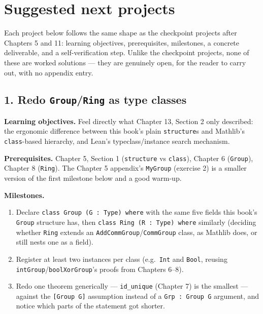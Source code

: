 \section{Suggested next projects}\label{sec:13-next-steps:03-next-projects:1}

Each project below follows the same shape as the checkpoint projects after Chapters 5 and 11: learning objectives, prerequisites, milestones, a concrete deliverable, and a self-verification step. Unlike the checkpoint projects, none of these are worked solutions --- they are genuinely open, for the reader to carry out, with no appendix entry.

\subsection{\texorpdfstring{1. Redo \texttt{Group}/\texttt{Ring} as type classes}{1. Redo Group/Ring as type classes}}\label{sec:13-next-steps:03-next-projects:2}

\textbf{Learning objectives.} Feel directly what Chapter 13, Section 2 only described: the ergonomic difference between this book's plain \texttt{structure}s and Mathlib's \texttt{class}-based hierarchy, and Lean's typeclass/instance search mechanism.

\textbf{Prerequisites.} Chapter 5, Section 1 (\texttt{structure} vs \texttt{class}), Chapter 6 (\texttt{Group}), Chapter 8 (\texttt{Ring}). The Chapter 5 appendix's \texttt{MyGroup} (exercise 2) is a smaller version of the first milestone below and a good warm-up.

\textbf{Milestones.}

\begin{enumerate}
\def\labelenumi{\arabic{enumi}.}
\tightlist
\item
  Declare \texttt{class Group (G : Type) where} with the same five fields this book's \texttt{Group} structure has, then \texttt{class Ring (R : Type) where} similarly (deciding whether \texttt{Ring} extends an \texttt{AddCommGroup}/\texttt{CommGroup} class, as Mathlib does, or still nests one as a field).
\item
  Register at least two instances per class (e.g.~\texttt{Int} and \texttt{Bool}, reusing \texttt{intGroup}/\texttt{boolXorGroup}'s proofs from Chapters 6--8).
\item
  Redo one theorem generically --- \texttt{id\_\allowbreak{}unique} (Chapter 7) is the smallest --- against the \texttt{[Group G]} assumption instead of a \texttt{Grp : Group G} argument, and notice which parts of the statement got shorter.
\end{enumerate}


